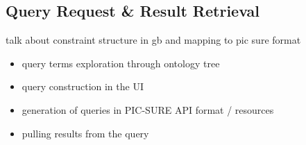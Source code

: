 

\subsection{Query Request & Result Retrieval}

talk about constraint structure in gb
and mapping to pic sure format 


\begin{itemize}
    \item query terms exploration through ontology tree
    \item query construction in the UI
    \item generation of queries in PIC-SURE API format / resources
    \item pulling results from the query
\end{itemize}


